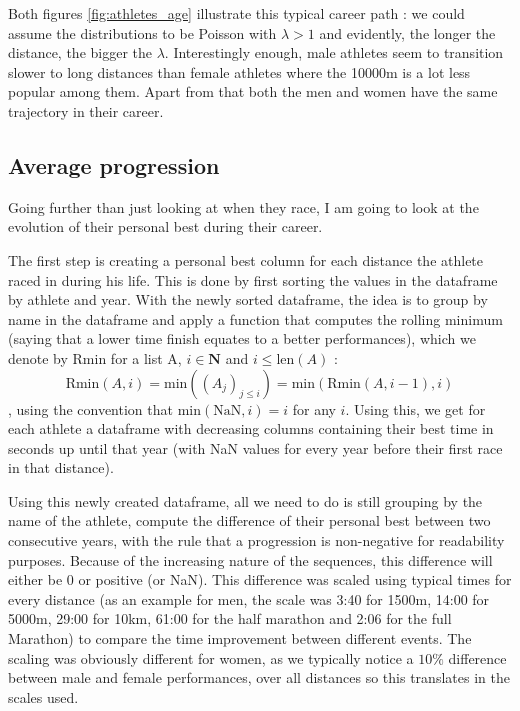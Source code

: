 \documentclass[10pt, a4paper]{article}
\begin{document}
Both figures \ref{fig:athletes_age} illustrate this typical career path : we could assume the distributions to be Poisson with $\lambda>1$ and evidently, the longer the distance, the bigger the $\lambda$. Interestingly enough, male athletes seem to transition slower to long distances than female athletes where the 10000m is a lot less popular among them. Apart from that both the men and women have the same trajectory in their career. \\


\subsection{Average progression}

Going further than just looking at when they race, I am going to look at the evolution of their personal best during their career.

The first step is creating a personal best column for each distance the athlete raced in during his life. This is done by first sorting the values in the dataframe by athlete and year. With the newly sorted dataframe, the idea is to group by name in the dataframe and apply a function that computes the rolling minimum (saying that a lower time finish equates to a better performances), which we denote by Rmin for a list A, $i \in \mathbf{N}$ and $ i\leq \text{len}(A)$ : $$\text{Rmin}(A,i) = \text{min}((A_j)_{j\leq i}) = \text{min}(\text{Rmin}(A,i-1),i)$$, using the convention that $\text{min}(\text{NaN},i) = i$ for any $i$. Using this, we get for each athlete a dataframe with decreasing columns containing their best time in seconds up until that year (with NaN values for every year before their first race in that distance).

Using this newly created dataframe, all we need to do is still grouping by the name of the athlete, compute the difference of their personal best between two consecutive years, with the rule that a progression is non-negative for readability purposes. Because of the increasing nature of the sequences, this difference will either be 0 or positive (or NaN). This difference was scaled using typical times for every distance (as an example for men, the scale was 3:40 for 1500m, 14:00 for 5000m, 29:00 for 10km, 61:00 for the half marathon and 2:06 for the full Marathon) to compare the time improvement between different events. The scaling was obviously different for women, as we typically notice a $10\%$ difference between male and female performances, over all distances so this translates in the scales used.
\end{document}
